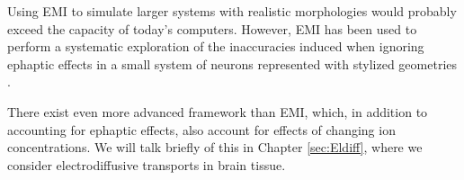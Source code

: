 Using EMI to simulate larger systems with realistic morphologies would probably exceed the capacity of today's computers. However, EMI has been used to perform a systematic exploration of the inaccuracies induced when ignoring ephaptic effects in a small system of neurons represented with stylized geometries  \cite{Tveito2017}. 

There exist even more advanced framework than EMI, which, in addition to accounting for ephaptic effects, also account for effects of changing ion concentrations. We will talk briefly of this in Chapter \ref{sec:Eldiff}, where we consider electrodiffusive transports in brain tissue.